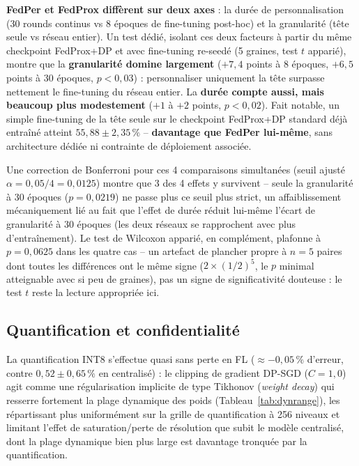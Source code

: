 \documentclass{acmart}
\begin{document}
\textbf{FedPer et FedProx diffèrent sur deux axes} : la durée de personnalisation
(30 rounds continus vs 8 époques de fine-tuning post-hoc) et la granularité (tête
seule vs réseau entier). Un test dédié, isolant ces deux facteurs à partir du même
checkpoint FedProx+DP et avec fine-tuning re-seedé (5 graines, test $t$ apparié),
montre que la \textbf{granularité domine largement} ($+7{,}4$ points à 8 époques,
$+6{,}5$ points à 30 époques, $p<0{,}03$) : personnaliser uniquement la tête surpasse
nettement le fine-tuning du réseau entier. La \textbf{durée compte aussi, mais
beaucoup plus modestement} ($+1$ à $+2$ points, $p<0{,}02$). Fait notable, un simple
fine-tuning de la tête seule sur le checkpoint FedProx+DP standard déjà entraîné
atteint $55{,}88\pm2{,}35\,\%$ -- \textbf{davantage que FedPer lui-même}, sans
architecture dédiée ni contrainte de déploiement associée.

Une correction de Bonferroni pour ces 4 comparaisons simultanées (seuil ajusté
$\alpha=0{,}05/4=0{,}0125$) montre que 3 des 4 effets y survivent -- seule la
granularité à 30 époques ($p=0{,}0219$) ne passe plus ce seuil plus strict, un
affaiblissement mécaniquement lié au fait que l'effet de durée réduit lui-même l'écart
de granularité à 30 époques (les deux réseaux se rapprochent avec plus d'entraînement).
Le test de Wilcoxon apparié, en complément, plafonne à $p=0{,}0625$ dans les quatre cas
-- un artefact de plancher propre à $n=5$ paires dont toutes les différences ont le même
signe ($2\times(1/2)^5$, le $p$ minimal atteignable avec si peu de graines), pas un
signe de significativité douteuse : le test $t$ reste la lecture appropriée ici.

\subsection{Quantification et confidentialité}

La quantification INT8 s'effectue quasi sans perte en FL ($\approx-0{,}05\,\%$
d'erreur, contre $0{,}52\pm0{,}65\,\%$ en centralisé) : le clipping de gradient
DP-SGD ($C=1{,}0$) agit comme une régularisation implicite de type Tikhonov
(\textit{weight decay}) qui resserre fortement la plage dynamique des poids
(Tableau~\ref{tab:dynrange}), les répartissant plus uniformément sur la grille de
quantification à 256 niveaux et limitant l'effet de saturation/perte de résolution
que subit le modèle centralisé, dont la plage dynamique bien plus large est davantage
tronquée par la quantification.
\end{document}
